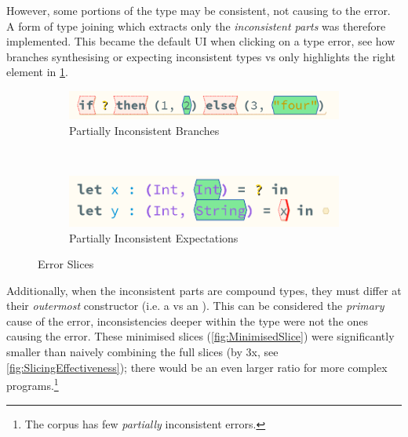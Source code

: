 However, some portions of the type may be consistent, not causing to the error. A form of type joining which extracts only the \textit{inconsistent parts} was therefore implemented. This became the default UI when clicking on a type error, see how branches synthesising or expecting inconsistent types  vs  only highlights the right element in \cref{fig:ErrorSlice}.

\begin{figure}[h]
\begin{subfigure}{0.45\textwidth}
\centering

\includegraphics[width=1\textwidth]{Media/Figures/partially_inconsistent_branches}
\caption{Partially Inconsistent Branches}
\end{subfigure}$\qquad$
\begin{subfigure}{0.45\textwidth}
\centering

\includegraphics[width=1\textwidth]{Media/Figures/partially_inconsistent_expectations}
\caption{Partially Inconsistent Expectations}
\end{subfigure}

\caption{Error Slices}
\label{fig:ErrorSlice}
\end{figure}

Additionally, when the inconsistent parts are compound types, they must differ at their \textit{outermost} constructor (i.e. a  vs an ). This can be considered the \textit{primary} cause of the error, inconsistencies deeper within the type were not the ones causing the error. These minimised slices (\cref{fig:MinimisedSlice}) were significantly smaller than naively combining the full slices (by 3x, see \cref{fig:SlicingEffectiveness}); there would be an even larger ratio for more complex programs.\footnote{The corpus has few \textit{partially} inconsistent errors.}


